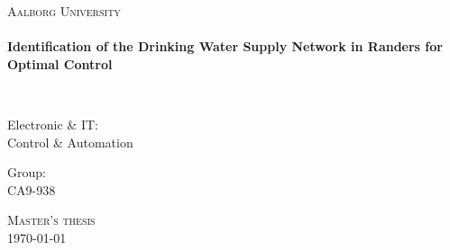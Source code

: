 \thispagestyle{empty}

\begin{center}

\vspace*{\fill}

\textsc{\LARGE Aalborg University}\\[1.0cm]

\HRule \\[0.2cm]
{ \LARGE \bfseries  Identification of the Drinking Water Supply Network in Randers for Optimal Control \\[0.2cm] }

\HRule \\[1.5cm]%

\begin{minipage}{0.4\textwidth}
\begin{flushleft} \large
Electronic \& IT:\\
Control \& Automation
\end{flushleft}
\end{minipage}
\begin{minipage}{0.4\textwidth}
\begin{flushright} \large
Group: \\
CA9-938
\end{flushright}
\end{minipage}

\vspace*{\fill}

\textsc{\Large Master's thesis}\\[1.0cm]

{\large \today}

\end{center}